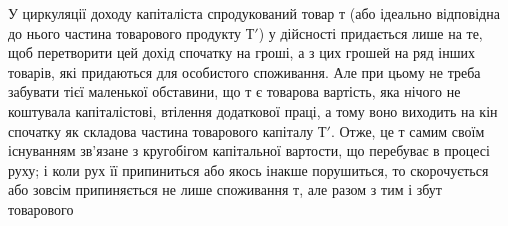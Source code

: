 У циркуляції доходу капіталіста спродукований товар т (або ідеально
відповідна до нього частина товарового продукту $Т'$) у дійсності придається
лише на те, щоб перетворити цей дохід спочатку на гроші, а з цих
грошей на ряд інших товарів, які придаються для особистого споживання.
Але при цьому не треба забувати тієї маленької обставини, що т є товарова
вартість, яка нічого не коштувала капіталістові, втілення додаткової
праці, а тому воно виходить на кін спочатку як складова частина товарового
капіталу $Т'$. Отже, це т самим своїм існуванням зв’язане з кругобігом
капітальної вартости, що перебуває в процесі руху; і коли рух
її припиниться або якось інакше порушиться, то скорочується або зовсім
припиняється не лише споживання т, але разом з тим і збут товарового
\parbreak{}  %
